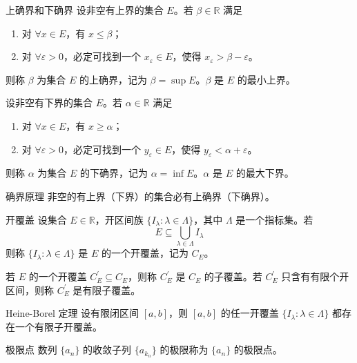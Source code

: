 \begin{definition}{上确界和下确界}
    设非空有上界的集合 $E$。若 $\beta \in \mathbb{R}$ 满足
    \begin{enumerate}
        \item 对 $\forall x \in E$，有 $x \leqslant \beta$；
        \item 对 $\forall \varepsilon > 0$，必定可找到一个 $x_{\varepsilon} \in E$，使得 $x_{\varepsilon} > \beta - \varepsilon$。
    \end{enumerate}
    则称 $\beta$ 为集合 $E$ 的上确界，记为 $\beta = \sup E$。$\beta$ 是 $E$ 的最小上界。

    设非空有下界的集合 $E$。若 $\alpha \in \mathbb{R}$ 满足
    \begin{enumerate}
        \item 对 $\forall x \in E$，有 $x \geqslant \alpha$；
        \item 对 $\forall \varepsilon > 0$，必定可找到一个 $y_{\varepsilon} \in E$，使得 $y_{\varepsilon} < \alpha + \varepsilon$。
    \end{enumerate}
    则称 $\alpha$ 为集合 $E$ 的下确界，记为 $\alpha = \inf E$。$\alpha$ 是 $E$ 的最大下界。

\end{definition}

\begin{theorem}{确界原理}
    非空的有上界（下界）的集合必有上确界（下确界）。
\end{theorem}

\begin{definition}{开覆盖}
    设集合 $E \in \mathbb{R}$，开区间族 $\{I_{\lambda} : \lambda \in \Lambda\}$，其中 $\Lambda$ 是一个指标集。若
    \[E \subseteq \bigcup_{\lambda \in \Lambda} I_{\lambda}\]
    则称 $\{I_{\lambda} : \lambda \in \Lambda\}$ 是 $E$ 的一个开覆盖，记为 $C_E$。

    若 $E$ 的一个开覆盖 $C_{E}^{'} \subseteq C_{E}$，则称 $C_{E}^{'}$ 是 $C_E$ 的子覆盖。若 $C_{E}^{'}$ 只含有有限个开区间，则称 $C_{E}^{'}$ 是有限子覆盖。
\end{definition}

\begin{theorem}{Heine-Borel 定理}
    设有限闭区间 $[a,b]$，则 $[a,b]$ 的任一开覆盖 $\{I_{\lambda} : \lambda \in \Lambda\}$ 都存在一个有限子开覆盖。
\end{theorem}

\begin{definition}{极限点}
    数列 $\{a_n\}$ 的收敛子列 $\{a_{k_n}\}$ 的极限称为 $\{a_n\}$ 的极限点。
\end{definition}

